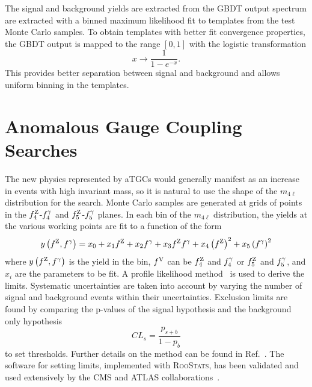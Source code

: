 The signal and background yields are extracted from the GBDT output spectrum are extracted with a binned maximum likelihood fit to templates from the test Monte Carlo samples.
To obtain templates with better fit convergence properties, the GBDT output is mapped to the range $\left[0,1\right]$ with the logistic transformation
\begin{equation}
  x \rightarrow \frac{1}{1-e^{-x}}.
\end{equation}
This provides better separation between signal and background and allows uniform binning in the templates.



\section{Anomalous Gauge Coupling Searches}

The new physics represented by aTGCs would generally manifest as an increase in events with high invariant mass, so it is natural to use the shape of the $m_{4\ell}$ distribution for the search.
Monte Carlo samples are generated at grids of points in the $f_4^\mathrm{Z}$-$f_4^\mathrm{\gamma}$ and $f_5^\mathrm{Z}$-$f_5^\mathrm{\gamma}$ planes.
In each bin of the $m_{4\ell}$ distribution, the yields at the various working points are fit to a function of the form
\begin{equation}
  y\left(f^\mathrm{Z},f^\mathrm{\gamma}\right) = x_0 + x_1 f^\mathrm{Z} + x_2 f^\mathrm{\gamma} + x_3 f^\mathrm{Z} f^\mathrm{\gamma} + x_4 \left(f^\mathrm{Z}\right)^2 + x_5 \left(f^\mathrm{\gamma}\right)^2
\end{equation}
where $y\left(f^\mathrm{Z},f^\mathrm{\gamma}\right)$ is the yield in the bin, $f^\mathrm{V}$ can be $f^\mathrm{Z}_4$ and $f^\mathrm{\gamma}_4$ or $f^\mathrm{Z}_5$ and $f^\mathrm{\gamma}_5$, and $x_i$ are the parameters to be fit.
A profile likelihood method~\cite{Olive:2016xmw} is used to derive the limits.
Systematic uncertainties are taken into account by varying the number of signal and background events within their uncertainties.
Exclusion limits are found by comparing the p-values of the signal hypothesis and the background only hypothesis
\begin{equation}
  CL_s = \frac{p_{s+b}}{1-p_b}
\end{equation}
to set thresholds.
Further details on the method can be found in Ref.~\cite{Cowan:2010js}.
The software for setting limits, implemented with \textsc{RooStats}, has been validated and used extensively by the CMS and ATLAS collaborations~\cite{CMS:2016nxa}.
